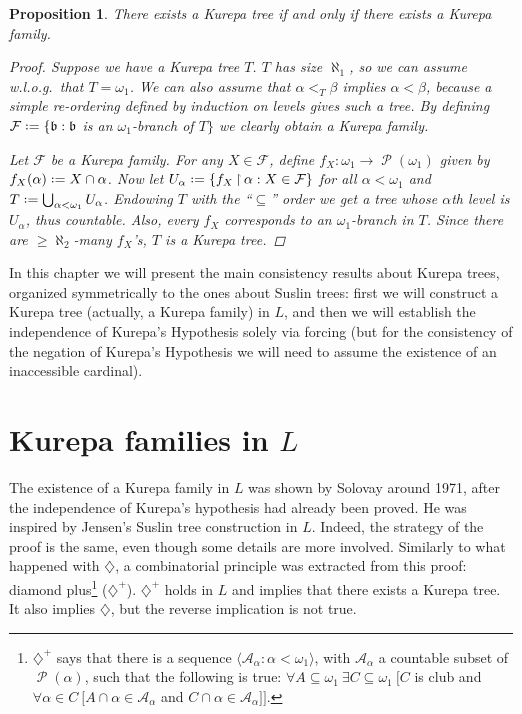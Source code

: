 \documentclass[11pt,a4paper]{report}
\newtheorem{proposition}[theorem]{Proposition}
\theoremstyle{definition}
\theoremstyle{num.custom-title}
\theoremstyle{custom-title}
\DeclareMathOperator{\PP}{\mathcal{P}}
\DeclareMathOperator{\sse}{\subseteq}
\DeclareMathOperator{\restr}{\upharpoonright}
\newcommand{\A}{\mathcal{A}}
\newcommand{\F}{\mathcal{F}}
\newcommand*{\defeq}{\mathrel{\rlap{%
                     \raisebox{0.3ex}{$\cdot$}}%
                     \raisebox{-0.3ex}{$\cdot$}}%
                     =}
\begin{document}
\begin{proposition}
There exists a Kurepa tree if and only if there exists a Kurepa family.
\begin{proof}
Suppose we have a Kurepa tree $T$. $T$ has size $\aleph_1$, so we can assume w.l.o.g.\ that $T = \omega_1$. We can also assume that $\alpha <_T \beta$ implies $\alpha < \beta$, because a simple re-ordering defined by induction on levels gives such a tree. By defining $\F \defeq \{ \mathfrak{b} : \mathfrak{b}$ is an $\omega_1$-branch of $T \}$ we clearly obtain a Kurepa family.

Let $\F$ be a Kurepa family. For any $X \in \F$, define $f_X \colon \omega_1 \to \PP(\omega_1)$ given by $f_X(\alpha) \defeq X \cap \alpha$. Now let $U_\alpha \defeq \{ f_X \restr \alpha : X \in \F \}$ for all $\alpha < \omega_1$ and $T \defeq \bigcup_{\alpha < \omega_1} U_\alpha$. Endowing $T$ with the ``$\sse$'' order we get a tree whose $\alpha$th level is $U_\alpha$, thus countable. Also, every $f_X$ corresponds to an $\omega_1$-branch in $T$. Since there are $\geq \aleph_2$-many $f_X$'s, $T$ is a Kurepa tree.
\end{proof}
\end{proposition}

In this chapter we will present the main consistency results about Kurepa trees, organized symmetrically to the ones about Suslin trees: first we will construct a Kurepa tree (actually, a Kurepa family) in $L$, and then we will establish the independence of Kurepa's Hypothesis solely via forcing (but for the consistency of the negation of Kurepa's Hypothesis we will need to assume the existence of an inaccessible cardinal).

\section{Kurepa families in $L$}

The existence of a Kurepa family in $L$ was shown by Solovay around 1971, after the independence of Kurepa's hypothesis had already been proved. He was inspired by Jensen’s Suslin tree construction in $L$. Indeed, the strategy of the proof is the same, even though some details are more involved. Similarly to what happened with $\diamondsuit$, a combinatorial principle was extracted from this proof: diamond plus\footnote{$\diamondsuit^+$ says that there is a sequence $\langle \A_\alpha : \alpha < \omega_1 \rangle$, with $\A_\alpha$ a countable subset of $\PP(\alpha)$, such that the following is true: $\forall A \sse \omega_1 \ \exists C \sse \omega_1 \ [C$ is club and $\forall \alpha \in C \ [A \cap \alpha \in \A_\alpha$ and $C \cap \alpha \in \A_\alpha]]$.} ($\diamondsuit^+$). $\diamondsuit^+$ holds in $L$ and implies that there exists a Kurepa tree. It also implies $\diamondsuit$, but the reverse implication is not true.
\end{document}
